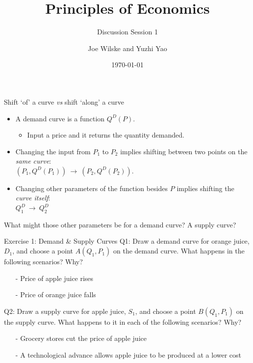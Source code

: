 \documentclass[9pt, handout]{beamer}
\title{Principles of Economics}
\subtitle{Discussion Session 1}
\author{Joe Wilske and Yuzhi Yao}
\institute{Boston College}
\date{\today}
\begin{document}
\frame{\titlepage}

\begin{frame}{Shift `of' a curve \textit{vs} shift `along' a curve}
    \begin{itemize}
        \item A demand curve is a function $Q^D(P)$.\\
        \begin{itemize}
            \item Input a price and it returns the quantity demanded.
            \vspace{5}
        \end{itemize}
        \item Changing the input from $P_1$ to $P_2$ implies shifting between two points on the \textit{same curve}:\\
        $(P_1, Q^D(P_1)) \: \longrightarrow \: (P_2, Q^D(P_2))$.
        \vspace{5}
        \item Changing other parameters of the function besides $P$ implies shifting the \textit{curve itself}:\\
        $Q_1^D \: \longrightarrow \: Q_2^D$
    \end{itemize}
    \vspace{20}
    What might those other parameters be for a demand curve? A supply curve?
\end{frame}

\begin{frame}{Exercise 1: Demand \& Supply Curves}
    Q1: Draw a demand curve for orange juice, $D_1$, and choose a point $A(Q_1, P_1)$ on the demand curve. What happens in the following scenarios?  Why?
    \begin{itemize}
        \item[-] Price of apple juice rises
        \item[-] Price of orange juice falls
    \end{itemize}
    \vspace{0.1in}
    Q2: Draw a supply curve for apple juice, $S_1$, and choose a point $B(Q_1, P_1)$ on the supply curve. What happens to it in each of the following scenarios? Why? 
    \begin{itemize}
        \item[-] Grocery stores cut the price of apple juice
        \item[-] A technological advance allows apple juice to be produced at a lower cost
    \end{itemize}
    \vspace{1.5in}
\end{frame}
\end{document}
